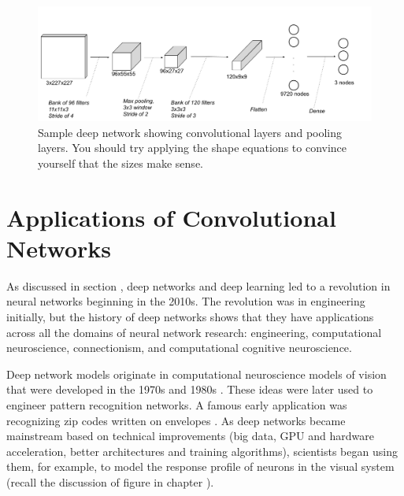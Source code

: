 \begin{figure}[h]
\centering
\includegraphics[scale=.45]{./images/deepNetExample.png}
\caption[Soraya Boza and Jeff Yoshimi ]{Sample deep network showing convolutional layers and pooling layers. You should try applying the shape equations to convince yourself that the sizes make sense. }
\label{deepNetExample}
\end{figure}

\section{Applications of Convolutional Networks}

 
As discussed in section , deep networks and deep learning led to a revolution in neural networks beginning in the 2010s. The revolution was in engineering initially, but the history of deep networks shows that they have applications across all the domains of neural network research: engineering, computational neuroscience, connectionism, and computational cognitive neuroscience. 

Deep network models originate in  computational neuroscience models of vision that were developed in the 1970s and 1980s \cite{fukushima1982neocognitron}. These ideas were later used to engineer pattern recognition networks. A famous early application was recognizing zip codes written on envelopes \cite{lecun1989backpropagation}. As deep networks became mainstream based on technical improvements (big data, GPU and hardware acceleration, better architectures and training algorithms), scientists began using them, for example, to model the response profile of neurons in the visual system (recall the discussion of figure  in chapter ). 

